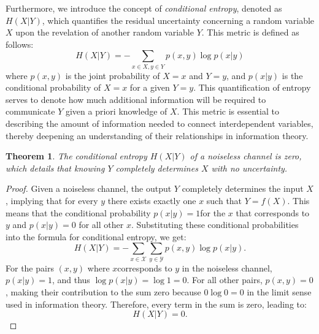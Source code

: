 \documentclass[journal,12pt,onecolumn,draftclsnofoot,]{IEEEtran}
\newtheorem{theorem}{Theorem}
\begin{document}
	Furthermore, we introduce the concept of \emph{conditional entropy}, denoted as \(H(X|Y)\), which quantifies the residual uncertainty concerning a random variable  \(X\) upon the revelation of another random variable \(Y\). This metric is defined as follows:
	\[
	H(X|Y) = -\sum_{x \in X, y \in Y} p(x, y) \log p(x|y)
	\]
	where \(p(x, y)\) is the joint probability of \(X=x\) and \(Y=y\), and \( p(x|y) \) is the conditional probability of \(X = x\) for a given \(Y = y\). This quantification of entropy serves to denote how much additional information will be required  to communicate \(Y\) given a priori knowledge of \(X\). This metric is essential to describing the amount of information needed to connect interdependent variables, thereby deepening an understanding of their relationships in information theory. 
	\begin{theorem}
		The conditional entropy \(H(X|Y)\) of a noiseless channel is zero, which details that knowing \(Y\) completely determines \(X\) with no uncertainty.
	\end{theorem}
	\begin{proof}
		Given a noiseless channel, the output \(Y\)  completely determines the input \(X\) , implying that for every \(y\)  there exists exactly one \(x\)  such that \(Y = f(X)\). This means that the conditional probability  \(p(x|y) = 1\)for the \(x\) that corresponds to \(y\) and \(p(x|y) = 0\)  for all other \(x\). Substituting these conditional probabilities into the formula for conditional entropy, we get:
		\begin{equation}
			H(X|Y) = -\sum_{x \in \mathcal{X}} \sum_{y \in \mathcal{Y}} p(x, y) \log p(x|y).
		\end{equation}
		For the pairs \((x, y)\) where \(x\)corresponds to \(y\) in the noiseless channel, \(p(x|y) = 1\), and thus \(\log p(x|y) = \log 1 = 0\). For all other pairs, \(p(x, y) = 0\), making their contribution to the sum zero because \(0 \log 0 = 0\) in the limit sense used in information theory. Therefore, every term in the sum is zero, leading to:
		\begin{equation}
			H(X|Y) = 0.
		\end{equation}
	\end{proof}
	
	
	
\end{document}

